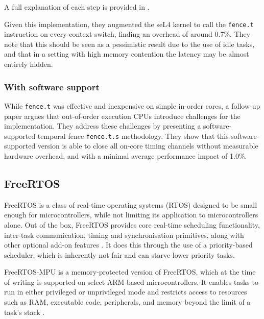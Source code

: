 A full explanation of each step is provided in \cite{wistoff2023}.

Given this implementation, they augmented the seL4 kernel to call the
\texttt{fence.t} instruction on every context switch, finding an overhead of
around 0.7\%. They note that this should be seen as a pessimistic result due to
the use of idle tasks, and that in a setting with high memory contention the
latency may be almost entirely hidden.

\subsubsection{With software support}
While \texttt{fence.t} was effective and inexpensive on simple in-order cores,
a follow-up paper \cite{wistoff2025} argues that out-of-order execution CPUs
introduce challenges for the implementation. They address these challenges by
presenting a software-supported temporal fence \texttt{fence.t.s} methodology.
They show that this software-supported version is able to close all on-core
timing channels without measurable hardware overhead, and with a minimal
average performance impact of 1.0\%.


\subsection{FreeRTOS}\label{sub:FreeRTOS} %
FreeRTOS is a class of real-time operating systems (RTOS) designed to be small
enough for microcontrollers, while not limiting its application to
microcontrollers alone. Out of the box, FreeRTOS provides core real-time
scheduling functionality, inter-task communication, timing and synchronisation
primitives, along with other optional add-on features
\cite{WhatFreeRTOSFreeRTOS2026}. It does this through the use of a
priority-based scheduler, which is inherently not fair and can starve lower
priority tasks.

FreeRTOS-MPU is a memory-protected version of FreeRTOS, which at the time of
writing is supported on select ARM-based microcontrollers. It enables tasks to
run in either privileged or unprivileged mode and restricts access to resources
such as RAM, executable code, peripherals, and memory beyond the limit of a
task's stack \cite{MemoryProtectionUnit2026}.


